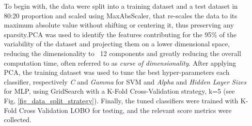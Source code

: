 To begin with, the data were split into a training dataset and a test dataset in 80:20 proportion and scaled using MaxAbsScaler, that re-scales the data to its maximum absolute value without shifting or centering it, thus preserving any sparsity.\ac{PCA} was used to identify the features contributing for the 95\% of the variability of the dataset and projecting them on a lower dimensional space, reducing the dimensionality to ~12 components and greatly reducing the overall computation time, often referred to as \emph{curse of dimensionality}. After applying \ac{PCA}, the training dataset was used to tune the best hyper-parameters each classifier, respectively \emph{C} and \emph{Gamma} for \ac{SVM} and \emph{Alpha} and \emph{Hidden Layer Sizes} for \ac{MLP}, using GridSearch with a K-Fold Cross-Validation strategy, k=5 (see Fig, \ref{fig_data_split_strategy}). Finally, the tuned classifiers were trained with K-Fold Cross Validation \ac{LOBO} for testing, and the relevant score metrics were collected.

